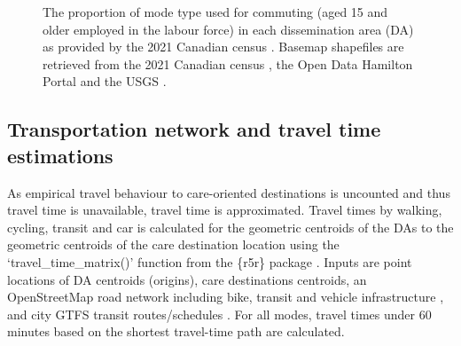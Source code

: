 \documentclass[
  authoryear,
  preprint,
  3p]{elsarticle}
\begin{document}
\begin{figure}


\caption{\label{fig-Fig4}The proportion of mode type used for commuting
(aged 15 and older employed in the labour force) in each dissemination
area (DA) as provided by the 2021 Canadian census
\citep{governmentofcanadaCensusPopulation2023}. Basemap shapefiles are
retrieved from the 2021 Canadian census
\citep{governmentofcanadaCensusPopulation2023}, the Open Data Hamilton
Portal \citep{opendatahamiltonCityBoundary2023} and the USGS
\citep{greatlakesUSGS2010}.}

\end{figure}%

\subsection{Transportation network and travel time
estimations}\label{transportation-network-and-travel-time-estimations}

As empirical travel behaviour to care-oriented destinations is uncounted
and thus travel time is unavailable, travel time is approximated. Travel
times by walking, cycling, transit and car is calculated for the
geometric centroids of the DAs to the geometric centroids of the care
destination location using the `travel\_time\_matrix()' function from
the \{r5r\} package \citep{pereiraR5rRapidRealistic2021}. Inputs are
point locations of DA centroids (origins), care destinations centroids,
an OpenStreetMap road network including bike, transit and vehicle
infrastructure \citep{geofabrikOntarioCanadaOpen2023}, and city GTFS
transit routes/schedules \citep{transitfeedsHamiltonStreetRailway2023}.
For all modes, travel times under 60 minutes based on the shortest
travel-time path are calculated.
\end{document}
